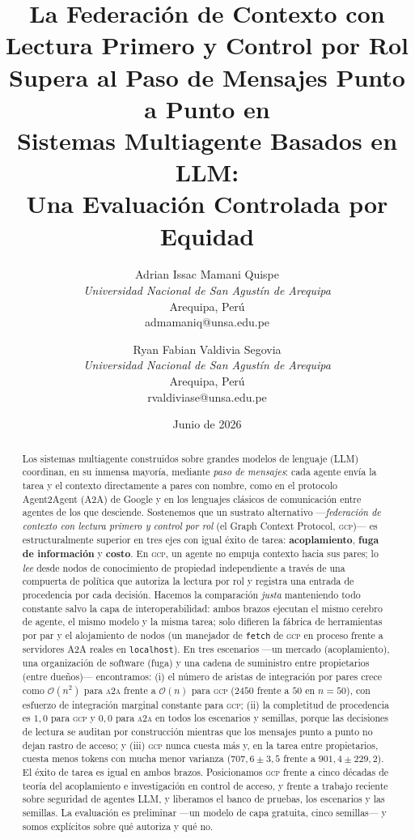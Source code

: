 \documentclass[10pt,twocolumn,letterpaper]{article}
\title{\textbf{La Federación de Contexto con Lectura Primero y Control por Rol\\
Supera al Paso de Mensajes Punto a Punto en\\
Sistemas Multiagente Basados en LLM:\\
Una Evaluación Controlada por Equidad}}
\author{%
Adrian Issac Mamani Quispe\\
\textit{Universidad Nacional de San Agust\'in de Arequipa}\\
Arequipa, Per\'u\\
admamaniq@unsa.edu.pe
\and
Ryan Fabian Valdivia Segovia\\
\textit{Universidad Nacional de San Agust\'in de Arequipa}\\
Arequipa, Per\'u\\
rvaldiviase@unsa.edu.pe
}
\date{Junio de 2026}
\newcommand{\gcp}{\textsc{gcp}}
\newcommand{\ata}{\textsc{a2a}}
\newcommand{\bigoh}{\mathcal{O}}
\begin{document}
\maketitle

\begin{abstract}
Los sistemas multiagente construidos sobre grandes modelos de lenguaje (LLM)
coordinan, en su inmensa mayoría, mediante \emph{paso de mensajes}: cada agente
envía la tarea y el contexto directamente a pares con nombre, como en el
protocolo Agent2Agent (A2A) de Google y en los lenguajes clásicos de
comunicación entre agentes de los que desciende. Sostenemos que un sustrato
alternativo ---\emph{federación de contexto con lectura primero y control por
rol} (el Graph Context Protocol, \gcp{})--- es estructuralmente superior en tres
ejes con igual éxito de tarea: \textbf{acoplamiento}, \textbf{fuga de
información} y \textbf{costo}. En \gcp{}, un agente no empuja contexto hacia sus
pares; lo \emph{lee} desde nodos de conocimiento de propiedad independiente a
través de una compuerta de política que autoriza la lectura por rol y registra
una entrada de procedencia por cada decisión. Hacemos la comparación
\emph{justa} manteniendo todo constante salvo la capa de interoperabilidad: ambos
brazos ejecutan el mismo cerebro de agente, el mismo modelo y la misma tarea;
solo difieren la fábrica de herramientas por par y el alojamiento de nodos (un
manejador de \texttt{fetch} de \gcp{} en proceso frente a servidores A2A reales
en \texttt{localhost}). En tres escenarios ---un mercado (acoplamiento), una
organización de software (fuga) y una cadena de suministro entre propietarios
(entre dueños)--- encontramos: (i) el número de aristas de integración por pares
crece como $\bigoh(n^2)$ para \ata{} frente a $\bigoh(n)$ para \gcp{} ($2450$
frente a $50$ en $n{=}50$), con esfuerzo de integración marginal constante para
\gcp{}; (ii) la completitud de procedencia es $1{,}0$ para \gcp{} y $0{,}0$ para
\ata{} en todos los escenarios y semillas, porque las decisiones de lectura se
auditan por construcción mientras que los mensajes punto a punto no dejan rastro
de acceso; y (iii) \gcp{} nunca cuesta más y, en la tarea entre propietarios,
cuesta menos tokens con mucha menor varianza ($707{,}6{\pm}3{,}5$ frente a
$901{,}4{\pm}229{,}2$). El éxito de tarea es igual en ambos brazos. Posicionamos
\gcp{} frente a cinco décadas de teoría del acoplamiento e investigación en
control de acceso, y frente a trabajo reciente sobre seguridad de agentes LLM, y
liberamos el banco de pruebas, los escenarios y las semillas. La evaluación es
preliminar ---un modelo de capa gratuita, cinco semillas--- y somos explícitos
sobre qué autoriza y qué no.
\end{abstract}
\end{document}
